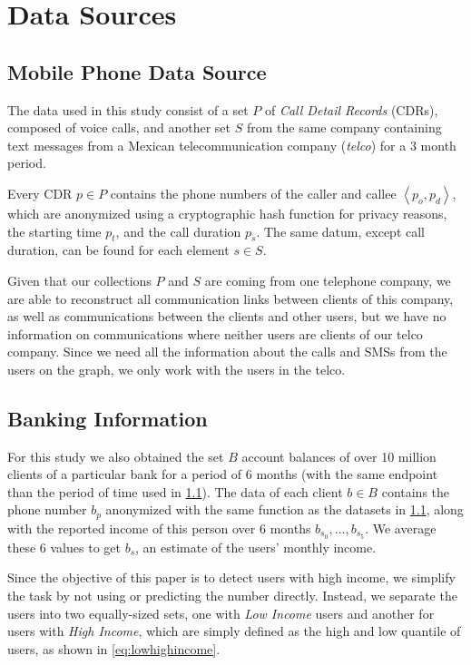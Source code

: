 \section{Data Sources}
\label{sec:data_sources}

\subsection{Mobile Phone Data Source}
\label{subsec:telcoinformation}

The data used in this study consist of a set $P$ of \textit{Call Detail Records} (CDRs), composed of voice calls, and another set $S$ from the same company containing text messages from a Mexican telecommunication company (\textit{telco}) for a 3 month period.

Every CDR $p \in P$ contains the phone numbers of the caller and callee $\left< p_o, p_d \right>$, which are anonymized using a cryptographic hash function for privacy reasons, the starting time \( p_t \), and the call duration \( p_s \). The same datum, except call duration, can be found for each element $s \in S$.

Given that our collections $P$ and $S$ are coming from one telephone company, we are able to reconstruct all communication links between clients of this company, as well as communications between the clients and other users, but we have no information on communications where neither users are clients of our telco company. Since we need all the information about the calls and SMSs from the users on the graph, we only work with the users in the telco.

\subsection{Banking Information}

For this study we also obtained the set $B$ account balances of over 10 million clients of a particular bank for a period of 6 months (with the same endpoint than the period of time used in \cref{subsec:telcoinformation}). The data of each client $b \in B$ contains the phone number $b_p$ anonymized with the same function as the datasets in \cref{subsec:telcoinformation}, along with the reported income of this person over 6 months $b_{s_0}, \ldots, b_{s_5}$. We average these 6 values to get $b_s$, an estimate of the users' monthly income.

Since the objective of this paper is to detect users with high income, we simplify the task by not using or predicting the number directly. Instead, we separate the users into two equally-sized sets, one with \emph{Low Income} users and another for users with \emph{High Income}, which are simply defined as the high and low quantile of users, as shown in \cref{eq:lowhighincome}.

